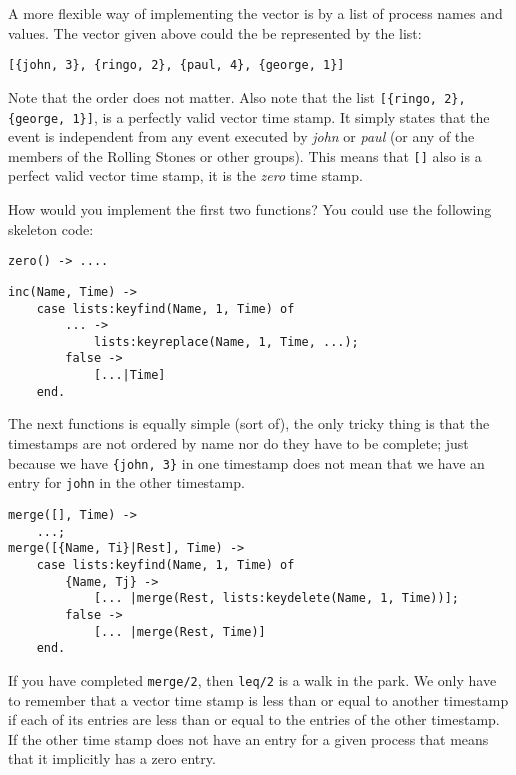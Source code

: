 \documentclass[a4paper,11pt]{article}
\begin{document}
A more flexible way of implementing the vector is by a list of process names and values. The vector given above could the be represented by the list:

\begin{verbatim}
[{john, 3}, {ringo, 2}, {paul, 4}, {george, 1}]
\end{verbatim}

\noindent Note that the order does not matter. Also note that the list
          {\tt [\{ringo, 2\}, \{george, 1\}]}, is a perfectly valid
          vector time stamp. It simply states that the event is
          independent from any event executed by {\em john} or {\em
            paul} (or any of the members of the Rolling Stones or other groups). This means that {\tt []} also is a perfect valid vector time stamp, it is the {\em zero} time stamp.

How would you implement the first two functions? You could use the following skeleton code:

\begin{verbatim}
zero() -> ....
\end{verbatim}

\begin{verbatim}
inc(Name, Time) ->
    case lists:keyfind(Name, 1, Time) of
        ... -> 
            lists:keyreplace(Name, 1, Time, ...);
        false ->
            [...|Time]
    end.
\end{verbatim}

The next functions is equally simple (sort of), the only tricky
thing is that the timestamps are not ordered by name nor do they have
to be complete; just because we have {\tt \{john, 3\}} in one
timestamp does not mean that we have an entry for {\tt john} in the
other timestamp.

\begin{verbatim}
merge([], Time) ->
    ...;
merge([{Name, Ti}|Rest], Time) ->
    case lists:keyfind(Name, 1, Time) of
        {Name, Tj} ->
            [... |merge(Rest, lists:keydelete(Name, 1, Time))];
        false ->
            [... |merge(Rest, Time)]
    end.
\end{verbatim}
 
If you have completed {\tt merge/2}, then {\tt leq/2} is a walk in the
park. We only have to remember that a vector time stamp is less than or
equal to another timestamp if each of its entries are less than or
equal to the entries of the other timestamp. If the other time stamp
does not have an entry for a given process that means that it
implicitly has a zero entry.
\end{document}
